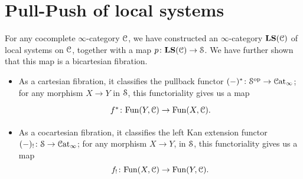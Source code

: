 \documentclass[main.tex]{subfiles}
\begin{document}
\section{Pull-Push of local systems}
\label{sec:the_non_monoidal_construction}

For any cocomplete $\infty$-category $\category{C}$, we have constructed an $\infty$-category $\LS(\category{C})$ of local systems on $\category{C}$, together with a map $p\colon \LS(\category{C}) \to \S$. We have further shown that this map is a bicartesian fibration.
\begin{itemize}
  \item As a cartesian fibration, it classifies the pullback functor $(-)^{*}\colon \S\op \to \ICat$; for any morphism $X \to Y$ in $\S$, this functoriality gives us a map
    \begin{equation*}
      \begin{tikzcd}
        f^{*}\colon \Fun(Y, \category{C}) \to \Fun(X, \category{C}).
      \end{tikzcd}
    \end{equation*}

  \item As a cocartesian fibration, it classifies the left Kan extension functor $(-)_{!}\colon \S \to \ICat$; for any morphism $X \to Y$, in $\S$, this functoriality gives us a map
    \begin{equation*}
      f_{!}\colon \Fun(X, \category{C}) \to \Fun(Y, \category{C}).
    \end{equation*}
\end{itemize}
\end{document}
